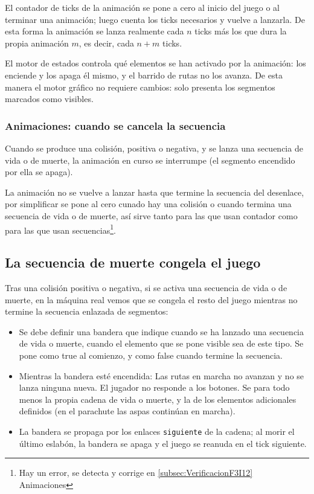El contador de ticks de la animación se pone a cero al inicio del juego o al terminar una animación; luego cuenta los ticks necesarios y vuelve a lanzarla. De esta forma la animación se lanza realmente cada $n$ ticks más los que dura la propia animación $m$, es decir, cada $n+m$ ticks.

El motor de estados controla qué elementos se han activado por la animación: los enciende y los apaga él mismo, y el barrido de rutas no los avanza. De esta manera el motor gráfico no requiere cambios: solo presenta los segmentos marcados como visibles.

\subsubsection{Animaciones: cuando se cancela la secuencia}
\label{sec:CambiosMenoresError1} 
Cuando se produce una colisión, positiva o negativa, y se lanza una secuencia de vida o de muerte, la animación en curso se interrumpe (el segmento encendido por ella se apaga). 

La animación no se vuelve a lanzar hasta que termine la secuencia del desenlace, por simplificar se pone al cero cunado hay una colisión o cuando termina una secuencia de vida o de muerte, así sirve tanto para las que usan contador como para las que usan secuencias\footnote{Hay un error, se detecta y corrige en \ref{subsec:VerificacionF3I12} Animaciones}.

\subsection{La secuencia de muerte congela el juego}

Tras una colisión positiva o negativa, si se activa una secuencia de vida o de muerte, en la máquina real vemos que se congela el resto del juego mientras no termine la secuencia enlazada de segmentos:

\begin{itemize}
	\item Se debe definir una bandera que indique cuando se ha lanzado una secuencia de vida o muerte, cuando el elemento que se pone visible sea de este tipo. Se pone como true al comienzo, y como false cuando termine la secuencia.
	
	\item Mientras la bandera esté encendida: Las rutas en marcha no avanzan y no se lanza ninguna nueva. El jugador no responde a los botones. Se para todo menos la propia cadena de vida o muerte, y la de los elementos adicionales definidos (en el parachute las aspas continúan en marcha).
	
	\item La bandera se propaga por los enlaces \texttt{siguiente} de la cadena; al morir el último eslabón, la bandera se apaga y el juego se reanuda en el tick siguiente.
\end{itemize}

